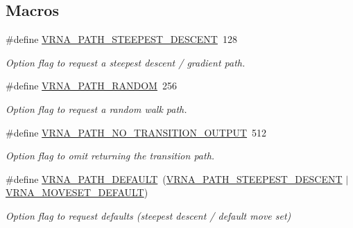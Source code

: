 \subsection*{Macros}
\begin{DoxyCompactItemize}
\item 
\#define \mbox{\hyperlink{group__paths__walk_ga705cea2b3243a38a2d6e3b1e141ed061}{V\+R\+N\+A\+\_\+\+P\+A\+T\+H\+\_\+\+S\+T\+E\+E\+P\+E\+S\+T\+\_\+\+D\+E\+S\+C\+E\+NT}}~128
\begin{DoxyCompactList}\small\item\em Option flag to request a steepest descent / gradient path. \end{DoxyCompactList}\item 
\#define \mbox{\hyperlink{group__paths__walk_ga0b84bd36bfd783130297797c51dd85ae}{V\+R\+N\+A\+\_\+\+P\+A\+T\+H\+\_\+\+R\+A\+N\+D\+OM}}~256
\begin{DoxyCompactList}\small\item\em Option flag to request a random walk path. \end{DoxyCompactList}\item 
\#define \mbox{\hyperlink{group__paths__walk_ga1ee63e54ecf136491e12ff03ede2622d}{V\+R\+N\+A\+\_\+\+P\+A\+T\+H\+\_\+\+N\+O\+\_\+\+T\+R\+A\+N\+S\+I\+T\+I\+O\+N\+\_\+\+O\+U\+T\+P\+UT}}~512
\begin{DoxyCompactList}\small\item\em Option flag to omit returning the transition path. \end{DoxyCompactList}\item 
\#define \mbox{\hyperlink{group__paths__walk_gaf1bb1f8fec8d24e3b821f621b19f77b4}{V\+R\+N\+A\+\_\+\+P\+A\+T\+H\+\_\+\+D\+E\+F\+A\+U\+LT}}~(\mbox{\hyperlink{group__paths__walk_ga705cea2b3243a38a2d6e3b1e141ed061}{V\+R\+N\+A\+\_\+\+P\+A\+T\+H\+\_\+\+S\+T\+E\+E\+P\+E\+S\+T\+\_\+\+D\+E\+S\+C\+E\+NT}} $\vert$ \mbox{\hyperlink{group__neighbors_gaa5ffec4dd0d02df320f123e6888154d1}{V\+R\+N\+A\+\_\+\+M\+O\+V\+E\+S\+E\+T\+\_\+\+D\+E\+F\+A\+U\+LT}})
\begin{DoxyCompactList}\small\item\em Option flag to request defaults (steepest descent / default move set) \end{DoxyCompactList}\end{DoxyCompactItemize}
